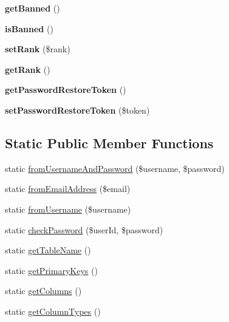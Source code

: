 \begin{DoxyCompactItemize}
\item 
\hypertarget{classUser_ac6bc61d57008fcdb5df52408bd38d337}{
{\bfseries getBanned} ()}
\label{classUser_ac6bc61d57008fcdb5df52408bd38d337}

\item 
\hypertarget{classUser_a6f7d2865725320b1ddfe09d6687f9895}{
{\bfseries isBanned} ()}
\label{classUser_a6f7d2865725320b1ddfe09d6687f9895}

\item 
\hypertarget{classUser_a1e1d45603c3b2e91b225e26f3f3f3c20}{
{\bfseries setRank} (\$rank)}
\label{classUser_a1e1d45603c3b2e91b225e26f3f3f3c20}

\item 
\hypertarget{classUser_ad7dc20ae557fb5dbd2b13af30b02165e}{
{\bfseries getRank} ()}
\label{classUser_ad7dc20ae557fb5dbd2b13af30b02165e}

\item 
\hypertarget{classUser_ab4cbe8a5b71b12a8d712e90e00e38bbe}{
{\bfseries getPasswordRestoreToken} ()}
\label{classUser_ab4cbe8a5b71b12a8d712e90e00e38bbe}

\item 
\hypertarget{classUser_afe28ad4e0c352b5dd96cc15637a1fc16}{
{\bfseries setPasswordRestoreToken} (\$token)}
\label{classUser_afe28ad4e0c352b5dd96cc15637a1fc16}

\end{DoxyCompactItemize}
\subsection*{Static Public Member Functions}
\begin{DoxyCompactItemize}
\item 
static \hyperlink{classUser_a62cc6354245bb44c7f24cea5bf9cd2ec}{fromUsernameAndPassword} (\$username, \$password)
\item 
static \hyperlink{classUser_a62f4d6923d634fe4e8cfba77c83fa170}{fromEmailAddress} (\$email)
\item 
static \hyperlink{classUser_acf26289b127b63a907e1bc97411001ed}{fromUsername} (\$username)
\item 
static \hyperlink{classUser_a656643953ca080f90ba0918c4bd84228}{checkPassword} (\$userId, \$password)
\item 
static \hyperlink{classUser_a3641dffbe0835b6cc56e875b21cba4b1}{getTableName} ()
\item 
static \hyperlink{classUser_a14fab2319493a4940e1975b72386e80a}{getPrimaryKeys} ()
\item 
static \hyperlink{classUser_a3a4c51317d99ac96fb282cf2ca3c15c9}{getColumns} ()
\item 
static \hyperlink{classUser_a2b6212bf34a2be45394c9a0a1220855c}{getColumnTypes} ()
\end{DoxyCompactItemize}
